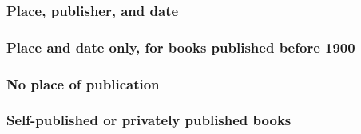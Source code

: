 \documentclass[11pt,letterpaper,oneside]{article}
\begin{document}
\begin{citebib}
\item \cite{boxer1953}
\item \cite{palmatary1950}
\end{citebib}

\subsubsection{Place, publisher, and date}

\begin{citebib}
\item \cite{woolf1927}
\end{citebib}

\subsubsection{Place and date only, for books published before 1900}

\begin{citebib}
\item \cite{goldsmith1766}
\item \cite{cervantes1605}
\end{citebib}

\setcounter{subsubsection}{131}
\subsubsection{No place of publication}

\begin{citeonly}
\item[] \cite{windsor1910}
\item[] \cite{vliet1890}
\end{citeonly}

\setcounter{subsubsection}{136}
\subsubsection{Self-published or privately published books}

\begin{citebib}
\item \cite{karavaev2015}
\item \cite{shumaker2014}
\end{citebib}
\end{document}
